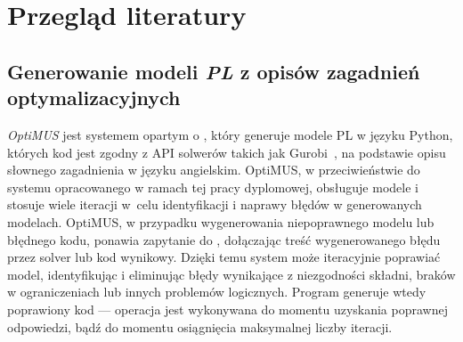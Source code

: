 
\chapter{Przegląd literatury}\label{ch:review}


\section{Generowanie modeli \textit{PL} z opisów zagadnień optymalizacyjnych}
\label{sec:optimus}
\textit{OptiMUS} \cite{ahmaditeshnizi2023optimus} jest systemem opartym o , który generuje modele PL w języku Python, których kod jest zgodny z API solwerów takich jak Gurobi~\cite{gurobi2023}, na podstawie opisu słownego zagadnienia w języku angielskim.
OptiMUS, w przeciwieństwie do systemu opracowanego w ramach tej pracy dyplomowej, obsługuje modele  i stosuje wiele iteracji w~celu identyfikacji i naprawy błędów w generowanych modelach.
OptiMUS, w przypadku wygenerowania niepoprawnego modelu lub błędnego kodu, ponawia zapytanie do , dołączając treść wygenerowanego błędu przez solver lub kod wynikowy. Dzięki temu system może iteracyjnie poprawiać model, identyfikując i eliminując błędy wynikające z niezgodności składni, braków w ograniczeniach lub innych problemów logicznych.
Program generuje wtedy poprawiony kod --- operacja jest wykonywana do momentu uzyskania poprawnej odpowiedzi, bądź do momentu osiągnięcia maksymalnej liczby iteracji.

